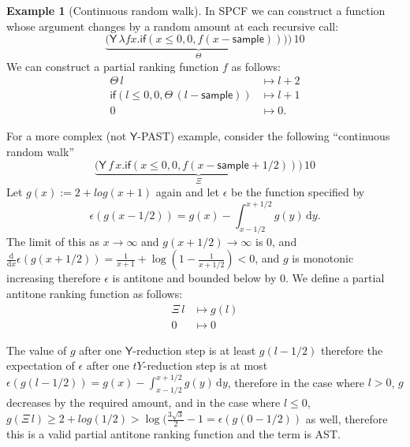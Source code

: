 \documentclass{article}
\newcommand{\tY}{\mathsf{Y}}
\newcommand{\tif}[3]{\mathsf{if}(#1, #2, #3)} %
\newcommand{\tsample}{\mathsf{sample}}
\theoremstyle{definition}
\newtheorem{example}{Example}
\theoremstyle{lemma}
\theoremstyle{remark}
\begin{document}
\begin{example}[Continuous random walk]\label{ex:raven complex}
In SPCF we can construct a function whose argument changes by a random amount at each recursive call:
\[
\underbrace{\big
(\tY \, \lambda f x . \tif{x \leq 0}{0}{f(x - \tsample))} \big)}_{\Theta} \, 10
\]
We can construct a partial ranking function $f$ as follows:
\begin{align*}
\Theta \, l 
&\mapsto 
l + 2
\\
\tif{l \leq 0}{0}{\Theta \, (l - \tsample)}
&\mapsto
l + 1
\\
0 &\mapsto 0.
\end{align*}

For a more complex (not $\tY$-PAST) example, consider the following ``continuous random walk''
\[
\underbrace{\big
(\tY \, f \, x . \tif{x \leq 0}{0}{f(x - \tsample + 1/2)} \big)}_{\Xi} \, 10
\]
Let $g(x) := 2 + log(x + 1)$ again and let $\epsilon$ be the function specified by
\[
\epsilon(g(x-1/2)) = g(x) - \int_{x-1/2}^{x+1/2}g(y) \, \mathrm d y.
\]
The limit of this as $x \to \infty$ and $g(x+1/2) \to \infty$ is 0, and $\frac {\mathrm d}{\mathrm dx} \epsilon(g(x+1/2)) = \frac 1 {x+1} + \log(1 - \frac 1 {x + 1/2}) < 0$, and $g$ is monotonic increasing therefore $\epsilon$ is antitone and bounded below by 0.
We define a partial antitone ranking function as follows:
\begin{align*}
\Xi \, l 
&\mapsto 
g(l)
\\
0 &\mapsto 0
\end{align*}
\end{example}
The value of $g$ after one $\tY$-reduction step is at least $g(l-1/2)$ therefore the expectation of $\epsilon$ after one $tY$-reduction step is at most $\epsilon(g(l-1/2)) = g(x) - \int_{x-1/2}^{x+1/2}g(y) \, \mathrm d y$, therefore in the case where $l > 0$, $g$ decreases by the required amount, and in the case where $l \leq 0$, $g(\Xi \, l) \geq 2 + log(1/2) > \log(\frac{3 \sqrt 3} 2 - 1 = \epsilon(g(0-1/2))$ as well, therefore this is a valid partial antitone ranking function and the term is AST.
\end{document}
